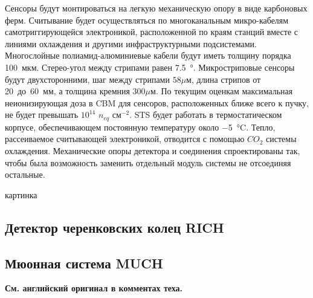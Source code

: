 Сенсоры будут монтироваться на легкую механическую опору в виде карбоновых ферм. Считывание будет осуществляться по многоканальным микро-кабелям самотриггирующейся электроникой, расположенной по краям станций вместе с линиями охлаждения и другими инфраструктурными подсистемами.
Многослойные полиамид-алюминиевые кабели будут иметь толщину порядка 100~мкм.
Стерео-угол между стрипами равен \SI{7.5}{\degree}.
Микростриповые сенсоры будут двухсторонними, шаг между стрипами $58 \mu$м, длина стрипов от 20~до~60~мм, а толщина кремния $300 \mu$м. По текущим оценкам максимальная неионизирующая доза в CBM для сенсоров, расположенных ближе всего к пучку, не будет превышать $10^{14}$ $n_{eq}$ см$^{-2}$. STS будет работать в термостатическом корпусе, обеспечивающем постоянную температуру около \SI{-5}{\degreeCelsius}. Тепло, рассеиваемое считывающей электроникой, отводится с помощью $CO_{2}$ системы охлаждения. Механические опоры детектора и соединения спроектированы так, чтобы была возможность заменить отдельный модуль системы не отсоединяя остальные.

\todo картинка



\subsection{Детектор черенковских колец RICH}\label{sec:secRICH}



\subsection{Мюонная система MUCH}\label{sec:secMUCH}

\textbf{См. английский оригинал в комментах теха.}


